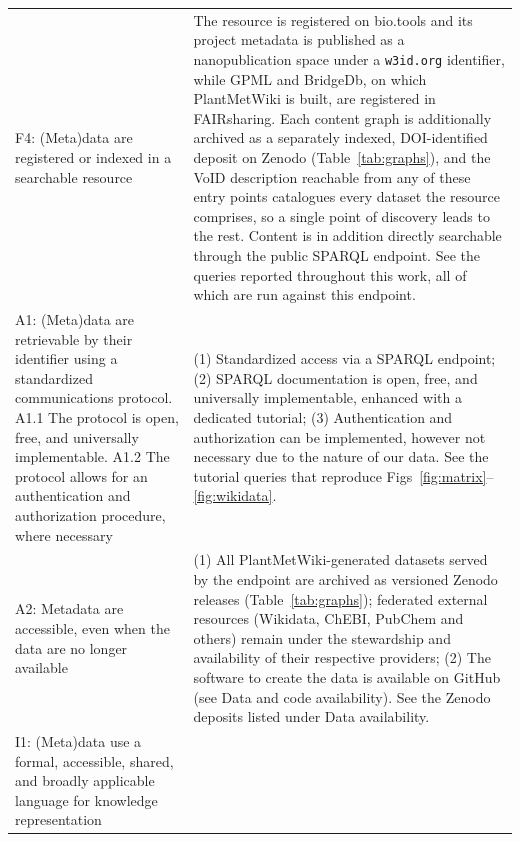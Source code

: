 \documentclass[11pt,a4paper]{article}
\newcommand{\rev}[1]{#1}
\begin{document}
{\begin{longtable}{p{} p{}}
F4: (Meta)data are registered or indexed in a searchable resource & The resource is registered on bio.tools and its project
metadata is published as a nanopublication space under a \texttt{w3id.\allowbreak{}org} identifier,
while GPML and BridgeDb, on which PlantMetWiki is built, are registered in FAIRsharing. Each content
graph is additionally archived as a separately indexed, DOI-identified deposit on Zenodo
(Table~\ref{tab:graphs}), and the VoID description reachable from any of these entry points
catalogues every dataset the resource comprises, so a single point of discovery leads to the rest.
Content is in addition directly searchable through the public SPARQL endpoint.
\rev{See the queries reported throughout this work, all of which are run against this endpoint.} \\
\addlinespace
A1: (Meta)data are retrievable by their identifier using a standardized communications protocol.
A1.1 The protocol is open, free, and universally implementable.
A1.2 The protocol allows for an authentication and authorization procedure, where necessary &
(1) Standardized access via a SPARQL endpoint;
(2) SPARQL documentation is open, free, and universally implementable, enhanced with a dedicated
tutorial;
(3) Authentication and authorization can be implemented, however not necessary due to the nature of
our data.
\rev{See the tutorial queries that reproduce Figs~\ref{fig:matrix}--\ref{fig:wikidata}.} \\
\addlinespace
A2: Metadata are accessible, even when the data are no longer available &
(1) All PlantMetWiki-generated datasets served by the endpoint are archived as versioned Zenodo
releases (Table~\ref{tab:graphs}); federated external resources (Wikidata, ChEBI, PubChem and
others) remain under the stewardship and availability of their respective providers;
(2) The software to create the data is available on GitHub (see Data and code availability).
\rev{See the Zenodo deposits listed under Data availability.} \\
\addlinespace
I1: (Meta)data use a formal, accessible, shared, and broadly applicable language for knowledge
representation &


\end{longtable}}
\end{document}
